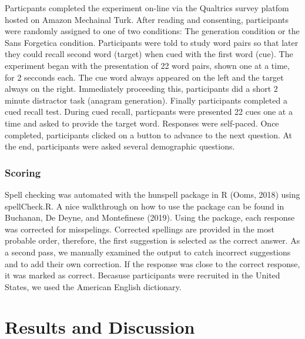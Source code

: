 \documentclass[english,pdf]{apa6}
\begin{document}
Particpants completed the experiment on-line via the Qualtrics survey platfom hosted on Amazon Mechainal Turk. After reading and consenting, participants were randomly assigned to one of two conditions: The generation condition or the Sans Forgetica condition. Participants were told to study word pairs so that later they could recall second word (target) when cued with the first word (cue). The experiment began with the presentation of 22 word pairs, shown one at a time, for 2 secconds each. The cue word always appeared on the left and the target always on the right. Immediately proceeding this, participants did a short 2 minute distractor task (anagram generation). Finally participants completed a cued recall test. During cued recall, particpants were presented 22 cues one at a time and asked to provide the target word. Responses were self-paced. Once completed, participants clicked on a button to advance to the next question. At the end, participants were asked several demographic questions.

\hypertarget{scoring}{%
\subsubsection{Scoring}\label{scoring}}

Spell checking was automated with the hunspell package in R (Ooms, 2018) using spellCheck.R. A nice walkthrough on how to use the package can be found in Buchanan, De Deyne, and Montefinese (2019). Using the package, each response was corrected for misspelings. Corrected spellings are provided in the most probable order, therefore, the first suggestion is selected as the correct answer. As a second pass, we manually examined the output to catch incorrect suggestions and to add their own correction. If the response was close to the correct response, it was marked as correct. Becasuse participants were recruited in the United States, we used the American English dictionary.

\hypertarget{results-and-discussion}{%
\section{Results and Discussion}\label{results-and-discussion}}
\end{document}
